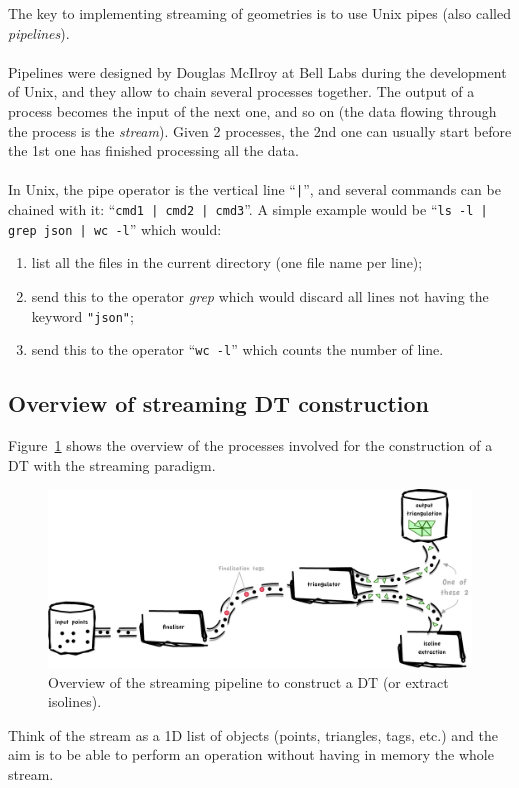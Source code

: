 \begin{floatbox}
\begin{kaobox-practice}[frametitle=\faCog\ Streaming is realised with Unix pipes]
  The key to implementing streaming of geometries is to use Unix pipes (also called \emph{pipelines}).
  \\ \\
  Pipelines were designed by Douglas McIlroy at Bell Labs during the development of Unix, and they allow to chain several processes together. The output of a process becomes the input of the next one, and so on (the data flowing through the process is the \emph{stream}). Given 2 processes, the 2nd one can usually start before the 1st one has finished processing all the data.
  \\ \\
  In Unix, the pipe operator is the vertical line ``\texttt{|}'', and several commands can be chained with it: ``\texttt{cmd1 | cmd2 | cmd3}''. 
  A simple example would be ``\texttt{ls -l | grep json | wc -l}'' which would:
  \begin{enumerate}
    \item list all the files in the current directory (one file name per line); 
    \item send this to the operator \emph{grep} which would discard all lines not having the keyword \texttt{"json"}; 
    \item send this to the operator ``\texttt{wc -l}'' which counts the number of line.
   \end{enumerate} 
\end{kaobox-practice}
\end{floatbox}

\subsection{Overview of streaming DT construction}
Figure~\ref{fig:streamingdt} shows the overview of the processes involved for the construction of a DT with the streaming paradigm.
\begin{figure}
  \centering
  \includegraphics[width=0.9\linewidth]{figs/streaming_pipeline}
  \caption{Overview of the streaming pipeline to construct a DT (or extract isolines).}%
\label{fig:streamingdt}
\end{figure}
Think of the stream as a 1D list of objects (points, triangles, tags, etc.) and the aim is to be able to perform an operation without having in memory the whole stream.


